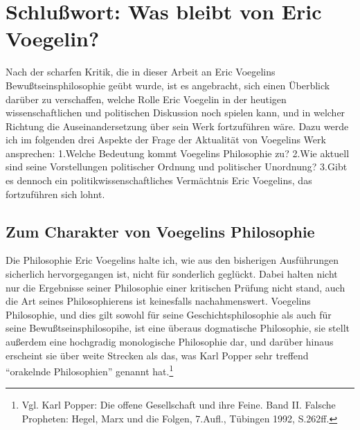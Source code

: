 

\chapter{Schlußwort: Was bleibt von Eric Voegelin?}

Nach der scharfen Kritik, die in dieser Arbeit an Eric Voegelins
Bewußtseinsphilosophie geübt wurde, ist es angebracht, sich einen Überblick
darüber zu verschaffen, welche Rolle Eric Voegelin in der heutigen
wissenschaftlichen und politischen Diskussion noch spielen kann, und in
welcher Richtung die Auseinandersetzung über sein Werk fortzuführen wäre. Dazu
werde ich im folgenden drei Aspekte der Frage der Aktualität von Voegelins
Werk ansprechen: 1.Welche Bedeutung kommt Voegelins Philosophie zu? 2.Wie
aktuell sind seine Vorstellungen politischer Ordnung und politischer
Unordnung? 3.Gibt es dennoch ein politikwissenschaftliches Vermächtnis Eric
Voegelins, das fortzuführen sich lohnt.

\section{Zum Charakter von Voegelins Philosophie}

Die Philosophie Eric Voegelins halte ich, wie aus den bisherigen
Ausführungen sicherlich hervorgegangen ist, nicht für sonderlich
geglückt. Dabei halten nicht nur die Ergebnisse seiner Philosophie einer
kritischen Prüfung nicht stand, auch die Art seines Philosophierens ist
keinesfalls nachahmenswert.  Voegelins Philosophie, und dies gilt sowohl
für seine Geschichtsphilosophie als auch für seine
Bewußtseinsphilosopihe, ist eine überaus dogmatische Philosophie, sie
stellt außerdem eine hochgradig monologische Philosophie dar, und
darüber hinaus erscheint sie über weite Strecken als das, was Karl
Popper sehr treffend "`orakelnde Philosophien"' genannt
hat.\footnote{Vgl. Karl Popper: Die offene Gesellschaft und ihre Feine.
  Band II. Falsche Propheten: Hegel, Marx und die Folgen, 7.Aufl.,
  Tübingen 1992, S.262ff.}

